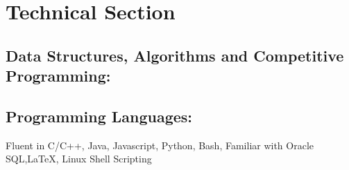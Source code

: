 \documentclass{article}
\begin{document}





\section*{Technical Section}

\subsection*{Data Structures, Algorithms and Competitive Programming: }

\subsection*{Programming Languages:}
Fluent in C/C++, Java, Javascript, Python, Bash, Familiar with Oracle SQL,{\LaTeX}, Linux Shell Scripting %

\end{document}
